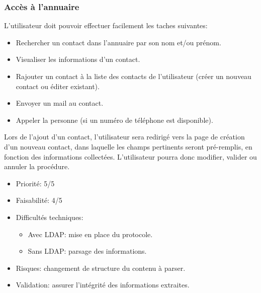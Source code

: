 \documentclass [pdftex,12pt] {report}
\begin{document}
\subsubsection{Accès à l'annuaire}
L'utilisateur doit pouvoir effectuer facilement les taches suivantes:
\begin{itemize}
\renewcommand{\labelitemi}{$\bullet$}
\item Rechercher un contact dans l'annuaire par son nom et/ou prénom.
\item Visualiser les informations d'un contact.
\item Rajouter un contact à la liste des contacts de l'utilisateur (créer un nouveau contact ou éditer existant).
\item Envoyer un mail au contact.
\item Appeler la personne (si un numéro de téléphone est disponible).
\end{itemize}
Lors de l'ajout d'un contact, l'utilisateur sera redirigé vers la page de création d'un nouveau contact, dans laquelle les champs pertinents seront pré-remplis, en fonction des informations collectées. L'utilisateur pourra donc modifier, valider ou annuler la procédure.

\begin{itemize}
\renewcommand{\labelitemi}{$\bullet$}
\item Priorité: 5/5
\item Faisabilité: 4/5
\item Difficultés techniques:
\begin{itemize}
\item Avec LDAP: mise en place du protocole.
\item Sans LDAP: parsage des informations.
\end{itemize} 
\item Risques: changement de structure du contenu à parser.
\item Validation: assurer l'intégrité des informations extraites.
\end{itemize}
\end{document}
